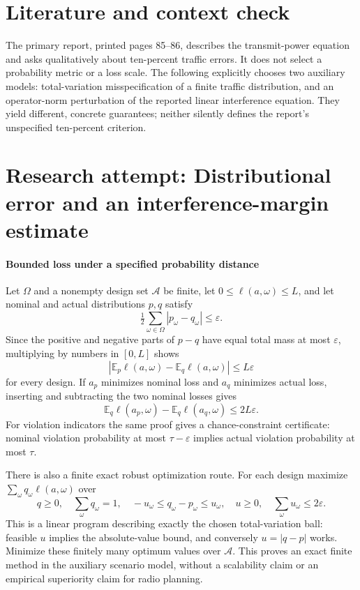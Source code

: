 \documentclass[11pt]{article}
\begin{document}
\section{Literature and context check}
The primary report, printed pages 85--86, describes the transmit-power equation and asks qualitatively about ten-percent traffic errors. It does not select a probability metric or a loss scale. The following explicitly chooses two auxiliary models: total-variation misspecification of a finite traffic distribution, and an operator-norm perturbation of the reported linear interference equation. They yield different, concrete guarantees; neither silently defines the report's unspecified ten-percent criterion.
\section{Research attempt: Distributional error and an interference-margin estimate}

\paragraph{Bounded loss under a specified probability distance}
Let $\Omega$ and a nonempty design set $\mathcal A$ be finite, let $0\leq\ell(a,\omega)\leq L$, and let nominal and actual distributions $p,q$ satisfy
\[
 \tfrac12\sum_{\omega\in\Omega}|p_\omega-q_\omega|\leq\varepsilon.
\]
Since the positive and negative parts of $p-q$ have equal total mass at most $\varepsilon$, multiplying by numbers in $[0,L]$ shows
\[
 |\mathbb E_p\ell(a,\omega)-\mathbb E_q\ell(a,\omega)|\leq L\varepsilon
 \tag{1}
\]
for every design. If $a_p$ minimizes nominal loss and $a_q$ minimizes actual loss, inserting and subtracting the two nominal losses gives
\[
 \mathbb E_q\ell(a_p,\omega)-\mathbb E_q\ell(a_q,\omega)\leq2L\varepsilon.
\]
For violation indicators the same proof gives a chance-constraint certificate: nominal violation probability at most $\tau-\varepsilon$ implies actual violation probability at most $\tau$.

There is also a finite exact robust optimization route. For each design maximize $\sum_\omega q_\omega\ell(a,\omega)$ over
\[
 q\geq0,\quad\sum_\omega q_\omega=1,\quad
 -u_\omega\leq q_\omega-p_\omega\leq u_\omega,\quad
 u\geq0,\quad\sum_\omega u_\omega\leq2\varepsilon.
\]
This is a linear program describing exactly the chosen total-variation ball: feasible $u$ implies the absolute-value bound, and conversely $u=|q-p|$ works. Minimize these finitely many optimum values over $\mathcal A$. This proves an exact finite method in the auxiliary scenario model, without a scalability claim or an empirical superiority claim for radio planning.
\end{document}
